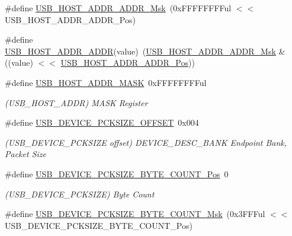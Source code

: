 \begin{DoxyCompactItemize}
\#define \mbox{\hyperlink{group___s_a_m_d21___u_s_b_ga4e91d6769b2a2d693e253c9e17cef4be}{U\+S\+B\+\_\+\+H\+O\+S\+T\+\_\+\+A\+D\+D\+R\+\_\+\+A\+D\+D\+R\+\_\+\+Msk}}~(0x\+F\+F\+F\+F\+F\+F\+F\+Ful $<$$<$ U\+S\+B\+\_\+\+H\+O\+S\+T\+\_\+\+A\+D\+D\+R\+\_\+\+A\+D\+D\+R\+\_\+\+Pos)
\item 
\#define \mbox{\hyperlink{group___s_a_m_d21___u_s_b_ga6ff1917bce6751f0bc55a5d990a5de02}{U\+S\+B\+\_\+\+H\+O\+S\+T\+\_\+\+A\+D\+D\+R\+\_\+\+A\+D\+DR}}(value)~(\mbox{\hyperlink{group___s_a_m_d21___u_s_b_ga4e91d6769b2a2d693e253c9e17cef4be}{U\+S\+B\+\_\+\+H\+O\+S\+T\+\_\+\+A\+D\+D\+R\+\_\+\+A\+D\+D\+R\+\_\+\+Msk}} \& ((value) $<$$<$ \mbox{\hyperlink{group___s_a_m_d21___u_s_b_ga608a4201f066a3b5f143967efd6b13b6}{U\+S\+B\+\_\+\+H\+O\+S\+T\+\_\+\+A\+D\+D\+R\+\_\+\+A\+D\+D\+R\+\_\+\+Pos}}))
\item 
\#define \mbox{\hyperlink{group___s_a_m_d21___u_s_b_ga6325bca8d8a0084c948acf6c3e60204e}{U\+S\+B\+\_\+\+H\+O\+S\+T\+\_\+\+A\+D\+D\+R\+\_\+\+M\+A\+SK}}~0x\+F\+F\+F\+F\+F\+F\+F\+Ful
\begin{DoxyCompactList}\small\item\em (U\+S\+B\+\_\+\+H\+O\+S\+T\+\_\+\+A\+D\+DR) M\+A\+SK Register \end{DoxyCompactList}\item 
\#define \mbox{\hyperlink{group___s_a_m_d21___u_s_b_ga187e4d2e49f2a3394c148f8ab1d49020}{U\+S\+B\+\_\+\+D\+E\+V\+I\+C\+E\+\_\+\+P\+C\+K\+S\+I\+Z\+E\+\_\+\+O\+F\+F\+S\+ET}}~0x004
\begin{DoxyCompactList}\small\item\em (U\+S\+B\+\_\+\+D\+E\+V\+I\+C\+E\+\_\+\+P\+C\+K\+S\+I\+ZE offset) D\+E\+V\+I\+C\+E\+\_\+\+D\+E\+S\+C\+\_\+\+B\+A\+NK Endpoint Bank, Packet Size \end{DoxyCompactList}\item 
\#define \mbox{\hyperlink{group___s_a_m_d21___u_s_b_gaef4d998ef9773a987ac4d050a6a2d10b}{U\+S\+B\+\_\+\+D\+E\+V\+I\+C\+E\+\_\+\+P\+C\+K\+S\+I\+Z\+E\+\_\+\+B\+Y\+T\+E\+\_\+\+C\+O\+U\+N\+T\+\_\+\+Pos}}~0
\begin{DoxyCompactList}\small\item\em (U\+S\+B\+\_\+\+D\+E\+V\+I\+C\+E\+\_\+\+P\+C\+K\+S\+I\+ZE) Byte Count \end{DoxyCompactList}\item 
\#define \mbox{\hyperlink{group___s_a_m_d21___u_s_b_ga14ac2c886ec23dc681a02ae8eab21bee}{U\+S\+B\+\_\+\+D\+E\+V\+I\+C\+E\+\_\+\+P\+C\+K\+S\+I\+Z\+E\+\_\+\+B\+Y\+T\+E\+\_\+\+C\+O\+U\+N\+T\+\_\+\+Msk}}~(0x3\+F\+F\+Ful $<$$<$ U\+S\+B\+\_\+\+D\+E\+V\+I\+C\+E\+\_\+\+P\+C\+K\+S\+I\+Z\+E\+\_\+\+B\+Y\+T\+E\+\_\+\+C\+O\+U\+N\+T\+\_\+\+Pos)
$$
\end{DoxyCompactItemize}
